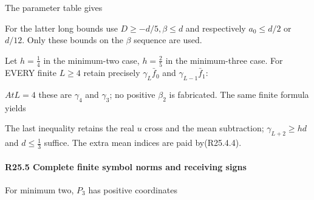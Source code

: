 The parameter table gives


For the latter long bounds use \(D\ge -d/5,\allowbreak \allowbreak  \beta\le d\) and respectively \(a_0\le d/2\) or \(d/12\). Only these bounds on the \(\beta\) sequence are used.

Let \(h=\frac{1}{4}\) in the minimum-two case, \(h=\frac{2}{5}\) in the minimum-three case. For EVERY finite \(L\ge 4\) retain precisely \(\gamma_L \bar f_{0}\) and \(\gamma_{L-1}\bar f_1\):


\(At L=4\) these are \(\gamma_{4}\) and \(\gamma_{3}\); no positive \(\beta_{2}\) is fabricated. The same finite formula yields


The last inequality retains the real \(u\) cross and the mean subtraction; \(\gamma_{L+2}\ge hd\) and \(d\le \frac{1}{3}\) suffice. The extra mean indices are paid by(R25.4.4).

\paragraph{R25.5 Complete finite symbol norms and receiving signs}

For minimum two, \(P_{3}\) has positive coordinates

